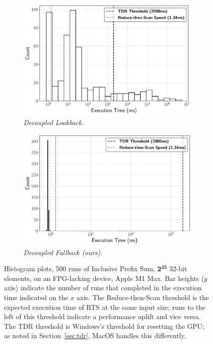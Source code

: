 \documentclass[sigconf,screen]{acmart}
\begin{document}
\begin{figure}
  \centering
  \begin{subfigure}[b]{0.45\linewidth}
    \includegraphics[width=\linewidth]{graphics/decoupled_lookback.pdf}
    \caption{\emph{Decoupled Lookback.}}
    \label{fig:decoupled}
  \end{subfigure}
  \hfill
  \begin{subfigure}[b]{0.45\linewidth}
    \includegraphics[width=\linewidth]{graphics/ours.pdf}
    \caption{\emph{Decoupled Fallback (ours).}}
    \label{fig:ours}
  \end{subfigure}
  \caption{Histogram plots, 500 runs of Inclusive Prefix Sum, $\mathbf{2^{25}}$ 32-bit elements, on an FPG-lacking device, Apple M1 Max. Bar heights ($y$ axis) indicate the number of runs that completed in the execution time indicated on the $x$ axis. The Reduce-then-Scan threshold is the expected execution time of RTS at the same input size; runs to the left of this threshold indicate a performance uplift and vice versa. The TDR threshold is Windows's threshold for resetting the GPU\@; as noted in Section~\ref{sec:tdr}, MacOS handles this differently.}
  \label{fig:dist}
\end{figure}
\end{document}

